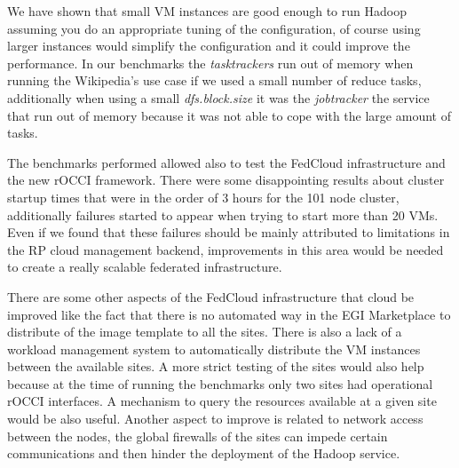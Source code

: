 \documentclass[oribibl]{llncs_Ibergrid2013}
\begin{document}
We have shown that small VM instances are good enough to run Hadoop assuming you do an appropriate tuning of the configuration, of course using larger instances would simplify the configuration and it could improve the performance. In our benchmarks the \emph{tasktrackers} run out of memory when running the Wikipedia's use case if we used a small number of reduce tasks, additionally when using a small \emph{dfs.block.size} it was the \emph{jobtracker} the service that run out of memory because it was not able to cope with the large amount of tasks.

The benchmarks performed allowed also to test the FedCloud infrastructure and the new rOCCI framework. There were some disappointing results about cluster startup times that were in the order of 3 hours for the 101 node cluster, additionally failures started to appear when trying to start more than 20 VMs. Even if we found that these failures should be mainly attributed to limitations in the RP cloud management backend, improvements in this area would be needed to create a really scalable federated infrastructure.

There are some other aspects of the FedCloud infrastructure that cloud be improved like the fact that there is no automated way in the EGI Marketplace to distribute of the image template to all the sites.
There is also a lack of a workload management system to automatically distribute the VM instances between the available sites. A more strict testing of the sites would also help because at the time of running the benchmarks only two sites had operational rOCCI interfaces.
A mechanism to query the resources available at a given site would be also useful.
Another aspect to improve is related to network access between the nodes, the global firewalls of the sites can impede certain communications and then hinder the deployment of the Hadoop service.
\end{document}

